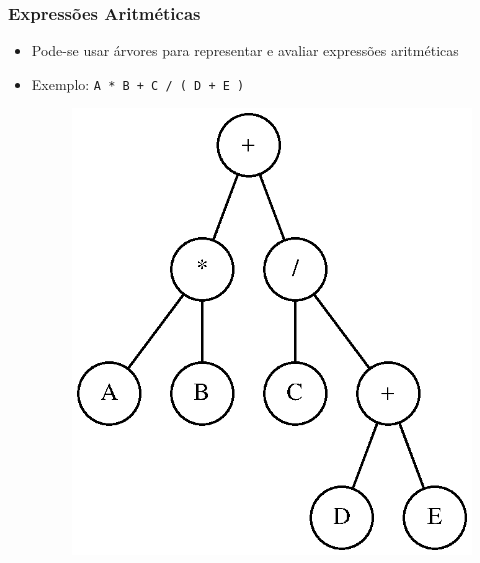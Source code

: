 \documentclass[aspectratio=169]{beamer}
\begin{document}
\begin{frame}
\begin{columns}[T]
\begin{column}{0.38\linewidth}
\begin{figure}[h]
\end{figure}
\end{column}
\end{columns}
\end{frame}

\begin{frame}\frametitle{Expressões Aritméticas}
\begin{itemize}
	\item Pode-se usar árvores para representar e avaliar expressões aritméticas
	\item Exemplo: \texttt{A * B + C / ( D + E )}
\begin{figure}[h]
	\centering
	\includegraphics[height=0.6\paperheight]{imagens/expressao_aritmetica.eps}
\end{figure}
\end{itemize}
\end{frame}
\end{document}
